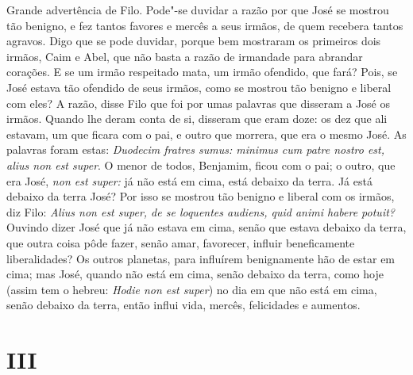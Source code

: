 Grande advertência de Filo. Pode"-se duvidar a razão por que José se
mostrou tão benigno, e fez tantos favores e mercês a seus irmãos, de
quem recebera tantos agravos. Digo que se pode duvidar, porque bem
mostraram os primeiros dois irmãos, Caim e Abel, que não basta a razão
de irmandade para abrandar corações. E se um irmão respeitado mata, um
irmão ofendido, que fará? Pois, se José estava tão ofendido de seus
irmãos, como se mostrou tão benigno e liberal com eles? A razão, disse
Filo que foi por umas palavras que disseram a José os irmãos. Quando lhe
deram conta de si, disseram que eram doze: os dez que ali estavam, um
que ficara com o pai, e outro que morrera, que era o mesmo José. As
palavras foram estas: \emph{Duodecim fratres sumus: minimus cum patre
nostro est, alius non est super}. O menor de todos, Benjamim,
ficou com o pai; o outro, que era José, \emph{non est super:} já não
está em cima, está debaixo da terra. Já está debaixo da terra José?
Por isso se mostrou tão benigno e liberal com os irmãos, diz Filo:
\emph{Alius non est super, de se loquentes audiens, quid animi habere
potuit?} Ouvindo dizer José que já não estava em cima, senão que
estava debaixo da terra, que outra coisa pôde fazer, senão amar,
favorecer, influir beneficamente liberalidades? Os outros planetas, para
influírem benignamente hão de estar em cima; mas José, quando não está
em cima, senão debaixo da terra, como hoje (assim tem o hebreu:
\emph{Hodie non est super}) no dia em que não está em cima, senão
debaixo da terra, então influi vida, mercês, felicidades e aumentos.

\section{III}

